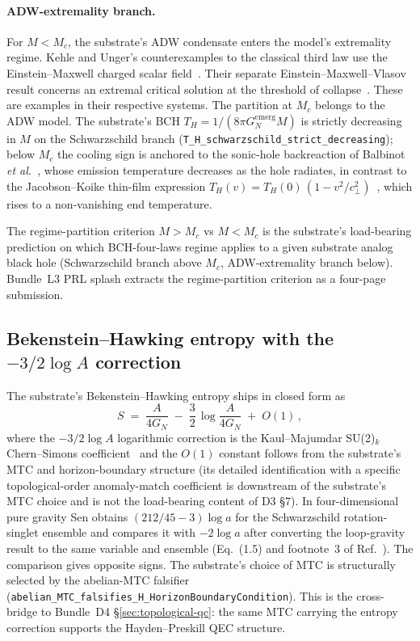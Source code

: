 \documentclass[aps,prd,reprint,nofootinbib,superscriptaddress]{revtex4-2}
\begin{document}
\paragraph{ADW-extremality branch.} For $M < M_c$, the substrate's
ADW condensate enters the model's extremality regime.
Kehle and Unger's counterexamples to the classical third law use
the Einstein--Maxwell charged scalar field~\cite{KehleUnger2022ThirdLaw}.
Their separate Einstein--Maxwell--Vlasov result concerns an extremal
critical solution at the threshold of collapse~\cite{KehleUnger2024}.
These are examples in their respective systems. The partition at $M_c$
belongs to the ADW model. The substrate's BCH
$T_H = 1/(8\pi G_N^{\mathrm{emerg}} M)$ is strictly decreasing in $M$
on the Schwarzschild branch (\texttt{T\_H\_schwarzschild\_strict\_decreasing});
below $M_c$ the cooling sign is anchored to the sonic-hole backreaction
of Balbinot \textit{et al.}~\cite{Balbinot2005}, whose emission
temperature decreases as the hole radiates, in contrast to the
Jacobson--Koike thin-film expression
$T_H(v) = T_H(0)\,(1 - v^2/c_\perp^2)$~\cite{JacobsonKoike2002}, which
rises to a non-vanishing end temperature.

The regime-partition criterion $M > M_c$ vs $M < M_c$ is the
substrate's load-bearing prediction on which BCH-four-laws regime
applies to a given substrate analog black hole (Schwarzschild branch
above $M_c$, ADW-extremality branch below). Bundle~L3 PRL splash
extracts the regime-partition criterion as a four-page submission.

\subsection{Bekenstein--Hawking entropy with the $-3/2 \log A$ correction}

The substrate's Bekenstein--Hawking entropy ships in closed form as
\begin{equation}
  S \;=\; \frac{A}{4 G_N} \;-\; \frac{3}{2}\,\log\!\frac{A}{4 G_N} \;+\; O(1)\,,
\end{equation}
where the $-3/2 \log A$ logarithmic correction is the Kaul--Majumdar
SU(2)$_k$ Chern--Simons coefficient~\cite{KaulMajumdar2000} and the
$O(1)$ constant follows from the substrate's MTC and horizon-boundary
structure (its detailed identification with a specific topological-order
anomaly-match coefficient is downstream of the substrate's MTC choice
and is not the load-bearing content of D3 \S 7). In four-dimensional
pure gravity Sen obtains $(212/45-3)\log a$ for the Schwarzschild
rotation-singlet ensemble and compares it with $-2\log a$ after
converting the loop-gravity result to the same variable and ensemble
(Eq.~(1.5) and footnote~3 of Ref.~\cite{Sen2013Schwarzschild}).
The comparison gives opposite signs. The substrate's choice of MTC is structurally
selected by the abelian-MTC falsifier
(\texttt{abelian\_MTC\_falsifies\_H\_HorizonBoundaryCondition}). This
is the cross-bridge to Bundle~D4
\S\ref{sec:topological-qc}: the same MTC carrying the entropy
correction supports the Hayden--Preskill QEC structure.
\end{document}
